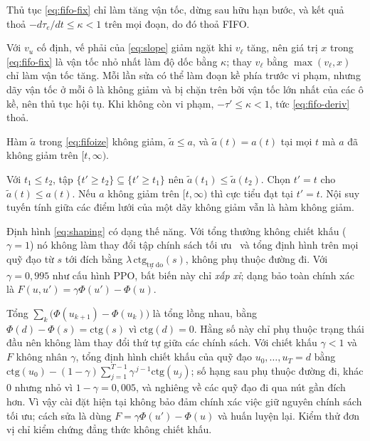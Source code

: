 \begin{bd}\label{bd:fifofix}
Thủ tục \eqref{eq:fifo-fix} chỉ làm tăng vận tốc, dừng sau hữu hạn bước, và kết quả thoả $-d\tau_e/dt\le\kappa<1$ trên mọi
đoạn, do đó thoả FIFO.
\end{bd}
\begin{cm}
Với $v_u$ cố định, vế phải của \eqref{eq:slope} giảm ngặt khi $v_\ell$ tăng, nên giá trị $x$ trong \eqref{eq:fifo-fix} là
vận tốc nhỏ nhất làm độ dốc bằng $\kappa$; thay $v_\ell$ bằng $\max(v_\ell,x)$ chỉ làm vận tốc tăng. Mỗi lần sửa có thể làm
đoạn kề phía trước vi phạm, nhưng dãy vận tốc ở mỗi ô là không giảm và bị chặn trên bởi vận tốc lớn nhất của các ô kề,
nên thủ tục hội tụ. Khi không còn vi phạm, $-\tau'\le\kappa<1$, tức \eqref{eq:fifo-deriv} thoả.
\end{cm}

\begin{md}\label{md:fifoize}
Hàm $\tilde a$ trong \eqref{eq:fifoize} không giảm, $\tilde a\le a$, và $\tilde a(t)=a(t)$ tại mọi $t$ mà $a$ đã không giảm trên $[t,\infty)$.
\end{md}
\begin{cm}
Với $t_1\le t_2$, tập $\{t'\ge t_2\}\subseteq\{t'\ge t_1\}$ nên $\tilde a(t_1)\le\tilde a(t_2)$. Chọn $t'=t$ cho
$\tilde a(t)\le a(t)$. Nếu $a$ không giảm trên $[t,\infty)$ thì cực tiểu đạt tại $t'=t$. Nội suy tuyến tính giữa các điểm lưới
của một dãy không giảm vẫn là hàm không giảm.
\end{cm}

\begin{md}\label{md:shaping}
Định hình \eqref{eq:shaping} có dạng thế năng. Với tổng thưởng không chiết khấu ($\gamma=1$) nó không làm thay đổi tập chính
sách tối ưu~\cite{ng1999} và tổng định hình trên mọi quỹ đạo từ $s$ tới đích bằng $\lambda\,\text{ctg}_{\text{tự do}}(s)$,
không phụ thuộc đường đi. Với $\gamma=0{,}995$ như cấu hình PPO, bất biến này chỉ \emph{xấp xỉ}; dạng bảo toàn chính xác là
$F(u,u')=\gamma\Phi(u')-\Phi(u)$.
\end{md}
\begin{cm}
Tổng $\sum_k \bigl(\Phi(u_{k+1})-\Phi(u_k)\bigr)$ là tổng lồng nhau, bằng $\Phi(d)-\Phi(s)=\text{ctg}(s)$ vì $\text{ctg}(d)=0$.
Hằng số này chỉ phụ thuộc trạng thái đầu nên không làm thay đổi thứ tự giữa các chính sách. Với chiết khấu $\gamma<1$ và
$F$ không nhân $\gamma$, tổng định hình chiết khấu của quỹ đạo $u_0,\dots,u_T=d$ bằng
$\text{ctg}(u_0)-(1-\gamma)\sum_{j=1}^{T-1}\gamma^{\,j-1}\text{ctg}(u_j)$; số hạng sau phụ thuộc đường đi, khác 0 nhưng nhỏ vì
$1-\gamma=0{,}005$, và nghiêng về các quỹ đạo đi qua nút gần đích hơn. Vì vậy cài đặt hiện tại không bảo đảm chính xác việc
giữ nguyên chính sách tối ưu; cách sửa là dùng $F=\gamma\Phi(u')-\Phi(u)$ và huấn luyện lại. Kiểm thử đơn vị chỉ kiểm chứng
đẳng thức không chiết khấu.
\end{cm}

